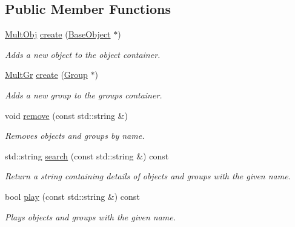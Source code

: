 \subsection*{Public Member Functions}
\begin{DoxyCompactItemize}
\item 
\hypertarget{classMultFS_aacf6a025364bd168fbd6dd37aaa6a152}{\hyperlink{classMultFS_a3862987abee233b7ea08a67abc80b245}{Mult\+Obj} \hyperlink{classMultFS_aacf6a025364bd168fbd6dd37aaa6a152}{create} (\hyperlink{classBaseObject}{Base\+Object} $\ast$)}\label{classMultFS_aacf6a025364bd168fbd6dd37aaa6a152}

\begin{DoxyCompactList}\small\item\em Adds a new object to the object container. \end{DoxyCompactList}\item 
\hypertarget{classMultFS_abd99f17847032c1f667843e2bd72c57c}{\hyperlink{classMultFS_a0c5fea8cc8ab29c2624d5863cf75cc6f}{Mult\+Gr} \hyperlink{classMultFS_abd99f17847032c1f667843e2bd72c57c}{create} (\hyperlink{classGroup}{Group} $\ast$)}\label{classMultFS_abd99f17847032c1f667843e2bd72c57c}

\begin{DoxyCompactList}\small\item\em Adds a new group to the groups container. \end{DoxyCompactList}\item 
\hypertarget{classMultFS_a8f223d40df0273ae8eccfc15c8925765}{void \hyperlink{classMultFS_a8f223d40df0273ae8eccfc15c8925765}{remove} (const std\+::string \&)}\label{classMultFS_a8f223d40df0273ae8eccfc15c8925765}

\begin{DoxyCompactList}\small\item\em Removes objects and groups by name. \end{DoxyCompactList}\item 
\hypertarget{classMultFS_aaddef4508d38645853d251cfe87a865a}{std\+::string \hyperlink{classMultFS_aaddef4508d38645853d251cfe87a865a}{search} (const std\+::string \&) const }\label{classMultFS_aaddef4508d38645853d251cfe87a865a}

\begin{DoxyCompactList}\small\item\em Return a string containing details of objects and groups with the given name. \end{DoxyCompactList}\item 
\hypertarget{classMultFS_a6f9ba46bf4916e4c1534a41f9222135a}{bool \hyperlink{classMultFS_a6f9ba46bf4916e4c1534a41f9222135a}{play} (const std\+::string \&) const }\label{classMultFS_a6f9ba46bf4916e4c1534a41f9222135a}

\begin{DoxyCompactList}\small\item\em Plays objects and groups with the given name. \end{DoxyCompactList}\end{DoxyCompactItemize}


